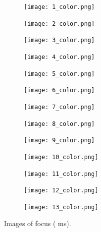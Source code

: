 \documentclass{article}
\newcommand{\Fokus}{\text{22.85}}
\newcommand{\FokusTime}{\text{8}}
\begin{document}
\begin{figure}[h!]
\centering
	\begin{subfigure}[b]{0.3\textwidth}
	\texttt{[image: 1\_color.png]}
\centering
	\end{subfigure}
	\begin{subfigure}[b]{0.3\textwidth}
		\texttt{[image: 2\_color.png]}
\centering
	\end{subfigure}
	\begin{subfigure}[b]{0.3\textwidth}
		\texttt{[image: 3\_color.png]}
\centering
	\end{subfigure}
	\begin{subfigure}[b]{0.3\textwidth}
		\texttt{[image: 4\_color.png]}
\centering
	\end{subfigure}
	\begin{subfigure}[b]{0.3\textwidth}
		\texttt{[image: 5\_color.png]}
\centering
	\end{subfigure}
		\begin{subfigure}[b]{0.3\textwidth}
		\texttt{[image: 6\_color.png]}
\centering
	\end{subfigure}
	\begin{subfigure}[b]{0.3\textwidth}
		\texttt{[image: 7\_color.png]}
\centering
		\text{Z = \Fokus{} mm}
	\end{subfigure}
		\begin{subfigure}[b]{0.3\textwidth}
		\texttt{[image: 8\_color.png]}
\centering
	\end{subfigure}
	\begin{subfigure}[b]{0.3\textwidth}
		\texttt{[image: 9\_color.png]}
\centering
	\end{subfigure}
		\begin{subfigure}[b]{0.3\textwidth}
		\texttt{[image: 10\_color.png]}
\centering
	\end{subfigure}
	\begin{subfigure}[b]{0.3\textwidth}
		\texttt{[image: 11\_color.png]}
\centering
	\end{subfigure}
		\begin{subfigure}[b]{0.3\textwidth}
		\texttt{[image: 12\_color.png]}
\centering
	\end{subfigure}
	\begin{subfigure}[b]{0.3\textwidth}
		\texttt{[image: 13\_color.png]}
\centering
	\end{subfigure}

\bigskip	
\caption{Images of focus ( \FokusTime{}ms).}
\end{figure}
\end{document}
